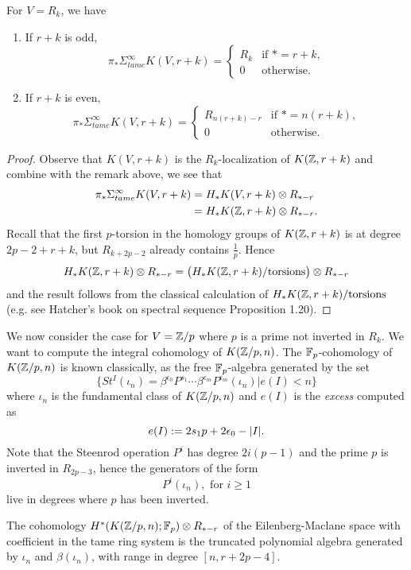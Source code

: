 \begin{lemma}
	For $V=R_k$, we have
\begin{enumerate}
	\item If $r+k$ is odd,
	 $$
	 \pi_* \Sigma_{tame}^{\infty}K(V,r+k) =
	 \begin{cases}
		R_k & \text{if $*=r+k$,}\\
		0 & \text{otherwise}.
	 \end{cases}
	 $$
	\item If $r+k$ is even,
	$$
	 \pi_* \Sigma_{tame}^{\infty}K(V,r+k) =
	 \begin{cases}
		R_{n(r+k)-r} & \text{if $*=n(r+k)$,}\\
		0 & \text{otherwise}.
	 \end{cases}
	 $$
\end{enumerate}
\end{lemma}
\begin{proof}
Observe that $K(V,r+k)$ is the $R_k$-localization of $K({\mathbb{Z}},r+k)$ and combine with the remark above, we see that 
	\begin{align*}
		\pi_* \Sigma_{tame}^{\infty}K(V,r+k) & = H_* K(V,r+k)\otimes R_{*-r}\\
		& = H_* K({\mathbb{Z}},r+k)\otimes R_{*-r}.
	\end{align*}
	Recall that the first $p$-torsion in the homology groups of $K({\mathbb{Z}},r+k)$ is at degree $2p-2+r+k$, but $R_{k+2p-2}$ already contains $\frac{1}{p}$. Hence 
	$$
	H_* K({\mathbb{Z}},r+k)\otimes R_{*-r} = \big(H_* K({\mathbb{Z}},r+k)/\text{torsions}\big) \otimes R_{*-r}
	$$ and the result follows from the classical calculation of $H_* K({\mathbb{Z}},r+k)/\text{torsions}$ (e.g. see Hatcher's book on spectral sequence Proposition 1.20). 
\end{proof}

We now consider the case for $V={\mathbb{Z}}/p$ where $p$ is a prime not inverted in $R_k$.
We want to compute the integral cohomology of $K({\mathbb{Z}}/p,n)$.
The ${\mathbb{F}}_p$-cohomology of $K({\mathbb{Z}}/p,n)$ is known classically, as the free ${\mathbb{F}}_p$-algebra generated by the set 
$$
\{
St^I(\iota_n)=\beta^{\epsilon_0}P^{s_1}\cdots \beta^{\epsilon_m}P^{\epsilon_m}(\iota_n) |
e(I)<n 
\}
$$
where $\iota_n$ is the fundamental class of $K({\mathbb{Z}}/p,n)$ and $e(I)$ is the \emph{excess} computed as
\[
e(I):=2s_1p+2\epsilon_0-\lvert I\rvert.
\]
Note that the Steenrod operation $P^i$ has degree $2i(p-1)$ and the prime $p$ is inverted in $R_{2p-3}$, hence the generators of the form
$$
P^i(\iota_n), \text{ for } i\geq 1
$$  
live in degrees where $p$ has been inverted.
\begin{corollary}
\label{F_p tame cohomology of K(Z/p,n)}
	The cohomology $H^*(K({\mathbb{Z}}/p,n);{\mathbb{F}}_p)\otimes R_{*-r}$ of the Eilenberg-Maclane space with coefficient in the tame ring system is the truncated polynomial algebra generated by 
	$\iota_n$ and $\beta(\iota_n)$, with range in degree $[n, r+2p-4]$.
\end{corollary}

